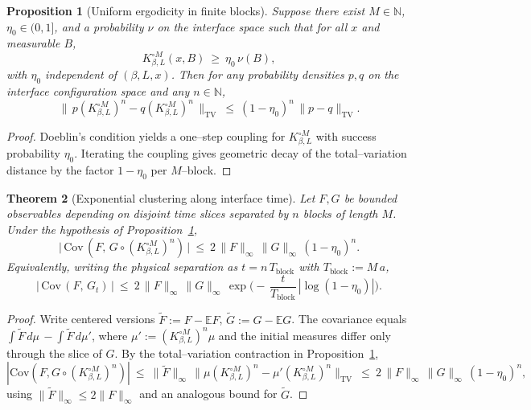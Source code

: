 \documentclass[11pt]{amsart}
\theoremstyle{plain}
\newtheorem{theorem}{Theorem}[section]
\newtheorem{proposition}[theorem]{Proposition}
\theoremstyle{definition}
\theoremstyle{remark}
\renewcommand{\tfrac}[2]{\textstyle\frac{#1}{#2}}
\begin{document}
\begin{proposition}[Uniform ergodicity in finite blocks]\label{prop:uniform-ergodicity-blocks}
Suppose there exist $M\in\mathbb N$, $\eta_0\in(0,1]$, and a probability $\nu$ on the interface space such that for all $x$ and measurable $B$,
\[
  K_{\beta,L}^{\circ M}(x,B)\ \ge\ \eta_0\, \nu(B),
\]
with $\eta_0$ independent of $(\beta,L,x)$. Then for any probability densities $p,q$ on the interface configuration space and any $n\in\mathbb N$,
\[
  \big\|\, p (K_{\beta,L}^{\circ M})^{n} - q (K_{\beta,L}^{\circ M})^{n} \,\big\|_{\mathrm{TV}}
   \ \le\ (1-\eta_0)^{n}\, \|p-q\|_{\mathrm{TV}}.
\]
\end{proposition}
\begin{proof}
Doeblin's condition yields a one--step coupling for $K_{\beta,L}^{\circ M}$ with success probability $\eta_0$. Iterating the coupling gives geometric decay of the total--variation distance by the factor $1-\eta_0$ per $M$--block.
\end{proof}

\begin{theorem}[Exponential clustering along interface time]\label{thm:exp-cluster-interface}
Let $F,G$ be bounded observables depending on disjoint time slices separated by $n$ blocks of length $M$. Under the hypothesis of Proposition~\ref{prop:uniform-ergodicity-blocks},
\[
  \big|\, \mathrm{Cov}\,(F,\, G\circ (K_{\beta,L}^{\circ M})^{n})\,\big|\ \le\ 2\,\|F\|_\infty\,\|G\|_\infty\,(1-\eta_0)^{n}.
\]
Equivalently, writing the physical separation as $t=n\,T_{\mathrm{block}}$ with $T_{\mathrm{block}}:=M\,a$,
\[
  \big|\, \mathrm{Cov}\,(F,\, G_t)\,\big|\ \le\ 2\,\|F\|_\infty\,\|G\|_\infty\, \exp\!\Big(-\, \tfrac{t}{T_{\mathrm{block}}}\, |\log(1-\eta_0)|\Big).
\]
\end{theorem}
\begin{proof}
Write centered versions $\widetilde F:=F-\mathbb E F$, $\widetilde G:=G-\mathbb E G$. The covariance equals $\int \widetilde F\, d\mu\, - \int \widetilde F\, d\mu'$, where $\mu' := (K_{\beta,L}^{\circ M})^{n}\mu$ and the initial measures differ only through the slice of $G$. By the total--variation contraction in Proposition~\ref{prop:uniform-ergodicity-blocks},
\[
  |\mathrm{Cov}(F, G\circ (K_{\beta,L}^{\circ M})^{n})| \ \le\ \|\widetilde F\|_\infty\, \big\|\mu (K_{\beta,L}^{\circ M})^{n} - \mu' (K_{\beta,L}^{\circ M})^{n}\big\|_{\mathrm{TV}}
   \ \le\ 2\,\|F\|_\infty\,\|G\|_\infty\,(1-\eta_0)^{n},
\]
using $\|\widetilde F\|_\infty\le 2\|F\|_\infty$ and an analogous bound for $\widetilde G$.
\end{proof}
\end{document}
